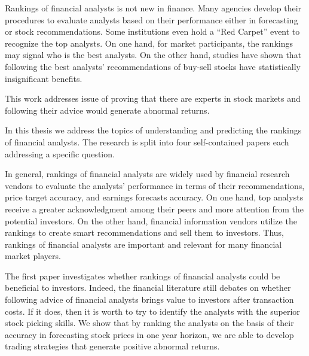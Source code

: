 Rankings of financial analysts is not new in finance. Many agencies develop their procedures to evaluate analysts based on their performance either in forecasting or stock recommendations. Some institutions even hold a ``Red Carpet'' event to recognize the top analysts. On one hand, for market participants, the rankings may signal who is the best analysts. On the other hand, studies have shown that following the best analysts' recommendations of buy-sell stocks have statistically insignificant benefits.



This work addresses issue of proving that there are experts in stock markets and following their advice would generate abnormal returns.



In this thesis we address the topics of understanding and predicting the rankings of  financial analysts.  The research is split into four self-contained papers each addressing a specific question. 




In general, rankings of financial analysts are widely used by  financial research vendors to evaluate the analysts' performance in terms of their recommendations, price target accuracy, and earnings forecasts accuracy. On one hand, top analysts receive a greater acknowledgment among their peers and more attention from the potential investors. On the other hand, financial information vendors utilize the rankings to create smart recommendations  and sell them to investors. Thus, rankings of financial analysts are important and relevant for many financial market players. 
 
 
The first paper investigates whether rankings of financial analysts could be  beneficial to investors. Indeed, the financial literature still debates on whether following advice of financial analysts brings value to investors after transaction costs. If it does, then it is worth to try  to identify the analysts with the superior stock picking skills. We show that by ranking the analysts on the basis of their accuracy in forecasting  stock prices in one year horizon, we are able to develop trading strategies that generate  positive abnormal returns. 

